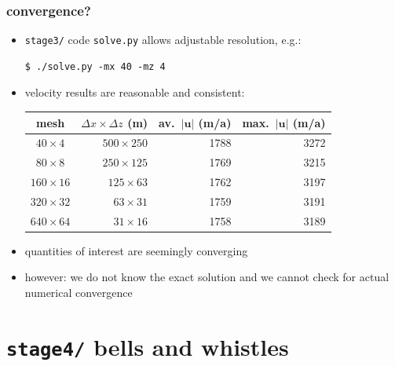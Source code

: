 \documentclass[10pt,
               hyperref={colorlinks,citecolor=DeepPink4,linkcolor=black,urlcolor=blue},
               svgnames]{beamer}
\newcommand{\bu}{\mathbf{u}}
\begin{document}
\begin{frame}[fragile]
\frametitle{convergence?}

\begin{itemize}
\item \texttt{stage3/} code \texttt{solve.py} allows adjustable resolution, e.g.:
\begin{Verbatim}
$ ./solve.py -mx 40 -mz 4
\end{Verbatim}
\item velocity results are reasonable and consistent:

\medskip
\begin{center}
\small
\begin{tabular}{c|rrr}
mesh           &   $\Delta x\times \Delta z$ (m) & av.~$|\bu|$ (m/a) & max.~$|\bu|$ (m/a) \\ \hline
$40\times 4$   &   $500 \times 250$ &        1788 &         3272 \\
$80\times 8$   &   $250 \times 125$ &        1769 &         3215 \\
$160\times 16$ &    $125 \times 63$ &        1762 &         3197 \\
$320\times 32$ &     $63 \times 31$ &        1759 &         3191 \\
$640\times 64$ &     $31 \times 16$ &        1758 &         3189
\end{tabular}
\normalsize
\end{center}

\item quantities of interest are seemingly converging
\item however: we do not know the exact solution and we cannot check for actual numerical convergence
\end{itemize}
\end{frame}


\section{\texttt{stage4/} \qquad bells and whistles}
\end{document}
